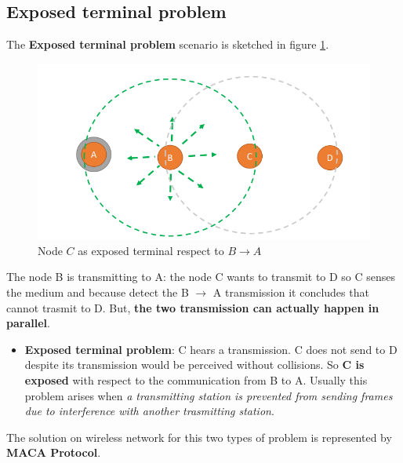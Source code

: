 \documentclass[10pt,a4paper]{report}
\theoremstyle{definition}
\begin{document}
\subsection{Exposed terminal problem}\label{sec:exposed-terminal-problem}
The \textbf{Exposed terminal problem} scenario is sketched in figure \ref{exposed-terminal}.
\begin{figure}[h!]
	\centering\includegraphics[scale=0.50]{images/Pasted image 20230225100636.png}
	\caption{Node $C$ as exposed terminal respect to $B \rightarrow A$}
	\label{exposed-terminal}
\end{figure}

The node B is transmitting to A: the node C wants to transmit to D so C senses the medium and because detect the B $\rightarrow$ A transmission it concludes that cannot trasmit to D. But, \textbf{the two transmission can actually happen in parallel}.
\begin{itemize}
	\item 
	\textbf{Exposed terminal problem}: C hears a transmission. C does not send to D despite its transmission would be perceived without collisions.  So \textbf{C is exposed} with respect to the communication from B to A.
	Usually this problem arises when \textit{a transmitting station is prevented from sending frames due to interference with another trasmitting station}.
\end{itemize}

The solution on wireless network for this two types of problem is represented by \textbf{MACA Protocol}.
\end{document}
